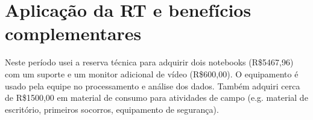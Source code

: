 \section{Aplicação da RT e benefícios complementares} %
Neste período usei a reserva técnica para adquirir dois notebooks (R\$5467,96)
com um suporte e um monitor adicional de vídeo (R\$600,00).
O equipamento é usado pela equipe no processamento e análise dos dados.
Também adquiri cerca de R\$1500,00 em material de consumo para atividades de campo
(e.g. material de escritório, primeiros socorros, equipamento de segurança).